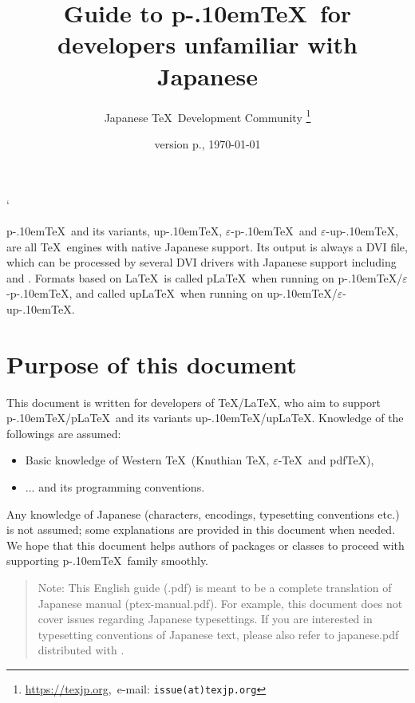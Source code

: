 \documentclass[a4paper,11pt,dvipdfmx]{article}
\let\emph=\origemph
\def\file#1{\textsf{#1}}
\def\eTeXpre{$\varepsilon$-}
\def\eTeX{\leavevmode\hbox{\eTeXpre\TeX}}
\def\epTeX{\leavevmode\hbox{\eTeXpre\pTeX}}
\def\eupTeX{\leavevmode\hbox{\eTeXpre\upTeX}}
\def\pTeX{p\kern-.10em\TeX}\def\upTeX{u\pTeX}
\def\pLaTeX{p\LaTeX}\def\upLaTeX{u\pLaTeX}
\def\pdfTeX{pdf\TeX}
\begin{document}
\catcode`
\title{\textsf{\textbf{Guide to \pTeX\ for developers unfamiliar with Japanese}}}
\author{Japanese \TeX\ Development Community\null
\thanks{\url{https://texjp.org},\ e-mail: \texttt{issue(at)texjp.org}}}
\date{version p\the\ptexversion.\the\ptexminorversion\ptexrevision, \today}
\maketitle

\pTeX\ and its variants, \upTeX, \epTeX\ and \eupTeX, are all \TeX\ engines
with native Japanese support.
Its output is always a DVI file, which can be processed by several
DVI drivers with Japanese support including \emph{dvips} and \emph{dvipdfmx}.
Formats based on \LaTeX\ is called \pLaTeX\ when running on \pTeX/\epTeX,
and called \upLaTeX\ when running on \upTeX/\eupTeX.

\section*{Purpose of this document}

This document is written for developers of \TeX/\LaTeX, who aim to
support \pTeX/\pLaTeX\ and its variants \upTeX/\upLaTeX.
Knowledge of the followings are assumed:
\begin{itemize}
  \item Basic knowledge of Western \TeX\ (Knuthian \TeX, \eTeX\ and \pdfTeX),
  \item ... and its programming conventions.
\end{itemize}

Any knowledge of Japanese (characters, encodings, typesetting conventions etc.)
is not assumed; some explanations are provided in this document when needed.
We hope that this document helps authors of packages or classes
to proceed with supporting \pTeX\ family smoothly.

\begin{quotation}
Note: This English guide (\file{\jobname.pdf}) is \emph{not} meant
to be a complete translation of Japanese manual (\file{ptex-manual.pdf}).
For example, this document does not cover issues regarding Japanese typesettings.
If you are interested in typesetting conventions of Japanese text, please also
refer to \file{japanese.pdf} distributed with .
\end{quotation}
\end{document}
